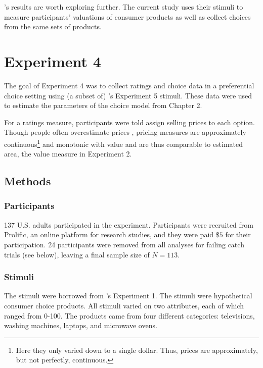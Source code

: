 \textcite{banerjeeFactorsThatPromote2024}'s results are worth exploring further. The current study uses their stimuli to measure participants' valuations of consumer products as well as collect choices from the same sets of products.

\section{Experiment 4}

The goal of Experiment 4 was to collect ratings and choice data in a preferential choice setting using (a subset of) \textcite{banerjeeFactorsThatPromote2024}'s Experiment 5 stimuli. These data were used to estimate the parameters of the choice model from Chapter 2. 

For a ratings measure, participants were told assign selling prices to each option. Though people often overestimate prices \parencite{breidertREVIEWMETHODSMEASURING2006}, pricing measures are approximately continuous\footnote{Here they only varied down to a single dollar. Thus, prices are approximately, but not perfectly, continuous.} and monotonic with value \parencite{miller2011should} and are thus comparable to estimated area, the value measure in Experiment 2.

\subsection{Methods}

\subsubsection{Participants}
137 U.S. adults participated in the experiment. Participants were recruited from Prolific, an online platform for research studies, and they were paid $\$5$ for their participation. 24 participants were removed from all analyses for failing catch trials (see below), leaving a final sample size of $N=113$. 

\subsubsection{Stimuli}

The stimuli were borrowed from \textcite{banerjeeFactorsThatPromote2024}'s Experiment 1. The stimuli were hypothetical consumer choice products. All stimuli varied on two attributes, each of which ranged from 0-100. The products came from four different categories: televisions, washing machines, laptops, and microwave ovens. 

